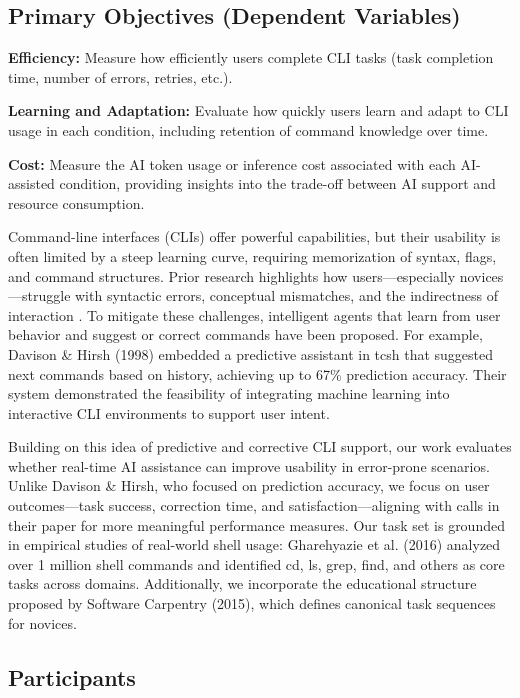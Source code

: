 \subsection{Primary Objectives (Dependent Variables)}

\textbf{Efficiency:} Measure how efficiently users complete CLI tasks (task completion time, number of errors, retries, etc.).

\textbf{Learning and Adaptation:} Evaluate how quickly users learn and adapt to CLI usage in each condition, including retention of command knowledge over time.

\textbf{Cost:} Measure the AI token usage or inference cost associated with each AI-assisted condition, providing insights into the trade-off between AI support and resource consumption.

Command-line interfaces (CLIs) offer powerful capabilities, but their usability is often limited by a steep learning curve, requiring memorization of syntax, flags, and command structures. Prior research highlights how users—especially novices—struggle with syntactic errors, conceptual mismatches, and the indirectness of interaction \cite{margono1987}. To mitigate these challenges, intelligent agents that learn from user behavior and suggest or correct commands have been proposed. For example, Davison \& Hirsh (1998) embedded a predictive assistant in tcsh that suggested next commands based on history, achieving up to 67\% prediction accuracy. Their system demonstrated the feasibility of integrating machine learning into interactive CLI environments to support user intent.

Building on this idea of predictive and corrective CLI support, our work evaluates whether real-time AI assistance can improve usability in error-prone scenarios. Unlike Davison \& Hirsh, who focused on prediction accuracy, we focus on user outcomes—task success, correction time, and satisfaction—aligning with calls in their paper for more meaningful performance measures. Our task set is grounded in empirical studies of real-world shell usage: Gharehyazie et al. (2016) analyzed over 1 million shell commands and identified cd, ls, grep, find, and others as core tasks across domains. Additionally, we incorporate the educational structure proposed by Software Carpentry (2015), which defines canonical task sequences for novices.

\subsection{Participants}


